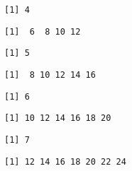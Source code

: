 \documentclass[
  letterpaper,
]{article}
\begin{document}
\begin{figure}

\begin{minipage}{0.20\linewidth}

\begin{verbatim}
[1] 4
\end{verbatim}

\end{minipage}%
%
\begin{minipage}{0.80\linewidth}

\begin{verbatim}
[1]  6  8 10 12
\end{verbatim}

\end{minipage}%
\newline
\begin{minipage}{0.20\linewidth}

\begin{verbatim}
[1] 5
\end{verbatim}

\end{minipage}%
%
\begin{minipage}{0.80\linewidth}

\begin{verbatim}
[1]  8 10 12 14 16
\end{verbatim}

\end{minipage}%
\newline
\begin{minipage}{0.20\linewidth}

\begin{verbatim}
[1] 6
\end{verbatim}

\end{minipage}%
%
\begin{minipage}{0.80\linewidth}

\begin{verbatim}
[1] 10 12 14 16 18 20
\end{verbatim}

\end{minipage}%
\newline
\begin{minipage}{0.20\linewidth}

\begin{verbatim}
[1] 7
\end{verbatim}

\end{minipage}%
%
\begin{minipage}{0.80\linewidth}

\begin{verbatim}
[1] 12 14 16 18 20 22 24
\end{verbatim}

\end{minipage}%

\end{figure}%
\end{document}

